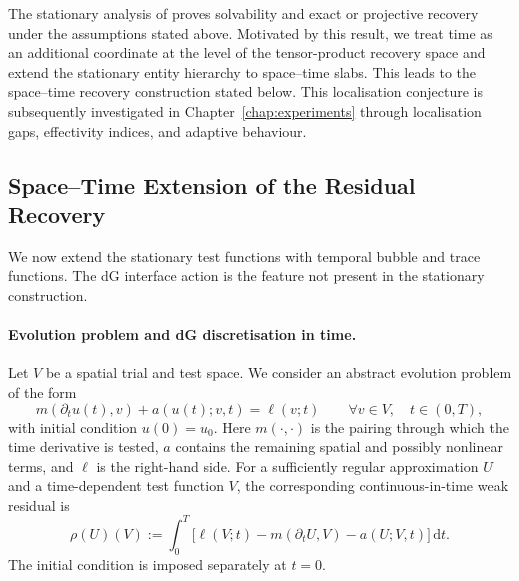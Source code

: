 The stationary analysis of \cite{Rognes_Logg_2013} proves solvability and exact or projective recovery under the assumptions stated above. Motivated by this result, we treat time as an additional coordinate at the level of the tensor-product recovery space and extend the stationary entity hierarchy to space--time slabs. 
This leads to the space--time recovery construction stated below. This localisation conjecture is subsequently investigated in Chapter~\ref{chap:experiments} through localisation gaps, effectivity indices, and adaptive behaviour.


\subsection{Space--Time Extension of the Residual Recovery}
\label{sec:space-time-residual-recovery}

We now extend the stationary test functions with temporal bubble and trace functions. The dG interface action is the feature not present in the stationary construction.


\paragraph{Evolution problem and dG discretisation in time.}
Let \(V\) be a spatial trial and test space. We consider an abstract evolution problem of the form
\begin{equation}
  m(\partial_tu(t),v)
  +
  a(u(t);v,t)
  =
  \ell(v;t)
  \qquad
  \forall v\in V,\quad t\in(0,T),
  \label{eq:abstract-evolution-problem}
\end{equation}
with initial condition \(u(0)=u_0\). Here \(m(\cdot,\cdot)\) is the pairing through which the time derivative is tested, \(a\) contains the remaining spatial and possibly nonlinear terms, and \(\ell\) is the right-hand side. For a sufficiently regular approximation \(U\) and a time-dependent test function \(V\), the corresponding continuous-in-time weak residual is
\begin{equation}
  \rho(U)(V)
  :=
  \int_0^T
  \Big[
    \ell(V;t)
    -
    m(\partial_tU,V)
    -
    a(U;V,t)
  \Big]\,\mathrm dt .
  \label{eq:continuous-evolution-residual}
\end{equation}
The initial condition is imposed separately at \(t=0\).

